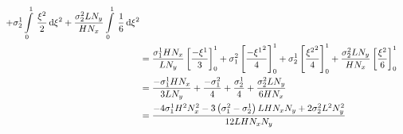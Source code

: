 \begin{equation}
\begin{aligned}
    +\conductivitytensorsymbol^{1}_{2}\gint{0}{1}{\dfrac{\xitwo}{2}}{\xitwo}
    +\dfrac{\conductivitytensorsymbol^{2}_{2} L N_{y}}{H N_{x}}\gint{0}{1}{\dfrac{1}{6}}{\xitwo} \\
    &=\dfrac{\conductivitytensorsymbol^{1}_{1} H N_{x}}{L N_{y}}\sqbrac{\dfrac{-\xione}{3}}^{1}_{0}
    +\conductivitytensorsymbol^{2}_{1}\sqbrac{\dfrac{-\xionesq}{4}}^{1}_{0}
    +\conductivitytensorsymbol^{1}_{2}\sqbrac{\dfrac{\xitwosq}{4}}^{1}_{0}
    +\dfrac{\conductivitytensorsymbol^{2}_{2} L N_{y}}{H N_{x}}\sqbrac{\dfrac{\xitwo}{6}}^{1}_{0} \\
    &=\dfrac{-\conductivitytensorsymbol^{1}_{1} H N_{x}}{3 L N_{y}}+\dfrac{-\conductivitytensorsymbol^{2}_{1}}{4}+
    \dfrac{\conductivitytensorsymbol^{1}_{2}}{4}+\dfrac{\conductivitytensorsymbol^{2}_{2} L N_{y}}{6 H N_{x}} \\
    &=\dfrac{-4\conductivitytensorsymbol^{1}_{1}H^{2}N_{x}^{2}-3\pbrac{\conductivitytensorsymbol^{2}_{1}-
        \conductivitytensorsymbol^{1}_{2}}L H N_{x} N_{y}+2\conductivitytensorsymbol^{2}_{2}L^{2}N_{y}^{2}}{12 L H N_{x} N_{y}}
  \end{aligned}
\end{equation}

